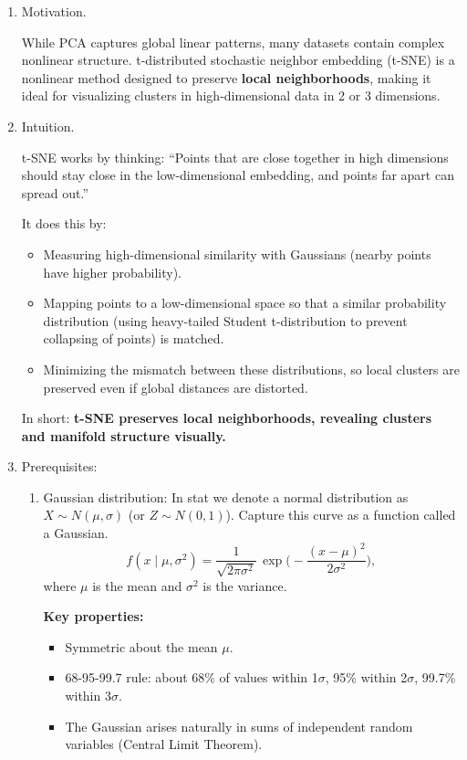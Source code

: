 \documentclass{article}
\begin{document}
\begin{enumerate}

\item Motivation.  

While PCA captures global linear patterns, many datasets contain complex nonlinear structure. t-distributed stochastic neighbor embedding (t-SNE) is a nonlinear method designed to preserve \textbf{local neighborhoods}, making it ideal for visualizing clusters in high-dimensional data in 2 or 3 dimensions.

\item Intuition.  

t-SNE works by thinking: ``Points that are close together in high dimensions should stay close in the low-dimensional embedding, and points far apart can spread out.''  

It does this by:

\begin{itemize}
\item Measuring high-dimensional similarity with Gaussians (nearby points have higher probability).
\item Mapping points to a low-dimensional space so that a similar probability distribution (using heavy-tailed Student t-distribution to prevent collapsing of points) is matched.
\item Minimizing the mismatch between these distributions, so local clusters are preserved even if global distances are distorted.
\end{itemize}

In short: \textbf{t-SNE preserves local neighborhoods, revealing clusters and manifold structure visually.}

\item Prerequisites:
\begin{enumerate}
\item Gaussian distribution: In stat we denote a normal distribution as $X \sim N(\mu, \sigma)$ (or $Z \sim N(0,1)$). Capture this curve as a function called a Gaussian.
\[
f(x \mid \mu, \sigma^2) = \frac{1}{\sqrt{2 \pi \sigma^2}} \, \exp\Big(- \frac{(x - \mu)^2}{2\sigma^2}\Big),
\]
where $\mu$ is the mean and $\sigma^2$ is the variance.  

\textbf{Key properties:}

\begin{itemize}
\item Symmetric about the mean $\mu$.
\item 68-95-99.7 rule: about 68\% of values within 1$\sigma$, 95\% within 2$\sigma$, 99.7\% within 3$\sigma$.
\item The Gaussian arises naturally in sums of independent random variables (Central Limit Theorem).
\end{itemize}


\end{enumerate}
\end{enumerate}
\end{document}
